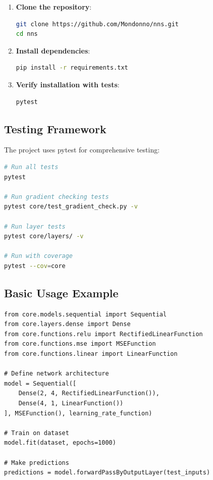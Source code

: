\documentclass[12pt,a4paper]{article}
\begin{document}
\begin{enumerate}
    \item \textbf{Clone the repository}:
    \begin{lstlisting}[language=bash, numbers=none]
git clone https://github.com/Mondonno/nns.git
cd nns
    \end{lstlisting}

    \item \textbf{Install dependencies}:
    \begin{lstlisting}[language=bash, numbers=none]
pip install -r requirements.txt
    \end{lstlisting}

    \item \textbf{Verify installation with tests}:
    \begin{lstlisting}[language=bash, numbers=none]
pytest
    \end{lstlisting}
\end{enumerate}

\subsection{Testing Framework}

The project uses pytest for comprehensive testing:

\begin{lstlisting}[language=bash, numbers=none, caption={Running tests}]
# Run all tests
pytest

# Run gradient checking tests
pytest core/test_gradient_check.py -v

# Run layer tests
pytest core/layers/ -v

# Run with coverage
pytest --cov=core
\end{lstlisting}

\subsection{Basic Usage Example}

\begin{lstlisting}[caption={Training a simple neural network}]
from core.models.sequential import Sequential
from core.layers.dense import Dense
from core.functions.relu import RectifiedLinearFunction
from core.functions.mse import MSEFunction
from core.functions.linear import LinearFunction

# Define network architecture
model = Sequential([
    Dense(2, 4, RectifiedLinearFunction()),
    Dense(4, 1, LinearFunction())
], MSEFunction(), learning_rate_function)

# Train on dataset
model.fit(dataset, epochs=1000)

# Make predictions
predictions = model.forwardPassByOutputLayer(test_inputs)
\end{lstlisting}
\end{document}
